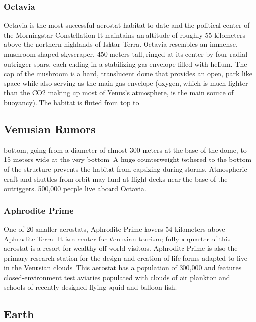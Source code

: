 \subsubsection{Octavia}

Octavia is the most successful aerostat habitat to date 
and the political center of the Morningstar Constellation
It maintains an altitude of roughly 55 kilometers
above the northern highlands of Ishtar Terra. Octavia 
resembles an immense, mushroom-shaped skyscraper, 
450 meters tall, ringed at its center by four radial 
outrigger spars, each ending in a stabilizing gas envelope
filled with helium. The cap of the mushroom
is a hard, translucent dome that provides an open, 
park like space while also serving as the main gas envelope
(oxygen, which is much lighter than the CO2
making up most of Venus's atmosphere, is the main 
source of buoyancy). The habitat is fluted from top to 

\subsection{Venusian Rumors}

bottom, going from a diameter of almost 300 meters 
at the base of the dome, to 15 meters wide at the very 
bottom. A huge counterweight tethered to the bottom 
of the structure prevents the habitat from capsizing 
during storms. Atmospheric craft and shuttles from 
orbit may land at flight decks near the base of the 
outriggers. 500,000 people live aboard Octavia. 

\subsubsection{Aphrodite Prime}

One of 20 smaller aerostats, Aphrodite Prime hovers 
54 kilometers above Aphrodite Terra. It is a center for 
Venusian tourism; fully a quarter of this aerostat is a 
resort for wealthy off-world visitors. Aphrodite Prime 
is also the primary research station for the design and 
creation of life forms adapted to live in the Venusian 
clouds. This aerostat has  a population of 300,000 and 
features closed-environment test aviaries populated 
with clouds of air plankton and schools of recently-designed
flying squid and balloon fish.

\subsection{Earth}

